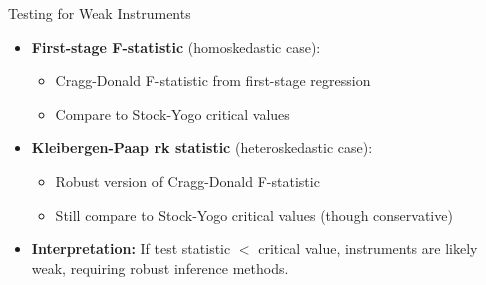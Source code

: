 \documentclass[dvipsnames,hyperref={pdfpagelabels=false}]{beamer}
\begin{document}
\begin{frame}{Testing for Weak Instruments}
	\begin{itemize}
		\item \textbf{First-stage F-statistic} (homoskedastic case):
				\vspace{0.2cm}
		\begin{itemize}
			\item Cragg-Donald F-statistic from first-stage regression
					\vspace{0.2cm}
			\item Compare to Stock-Yogo critical values
		\end{itemize}
		\vspace{0.2cm}
		
		\item \textbf{Kleibergen-Paap rk statistic} (heteroskedastic case):
				\vspace{0.2cm}
		\begin{itemize}
			\item Robust version of Cragg-Donald F-statistic
					\vspace{0.2cm}
			\item Still compare to Stock-Yogo critical values (though conservative)
		\end{itemize}
		\vspace{0.2cm}
		
		\item \textbf{Interpretation:} If test statistic $<$ critical value, instruments are likely weak, requiring robust inference methods.
	\end{itemize}
\end{frame}
\end{document}
